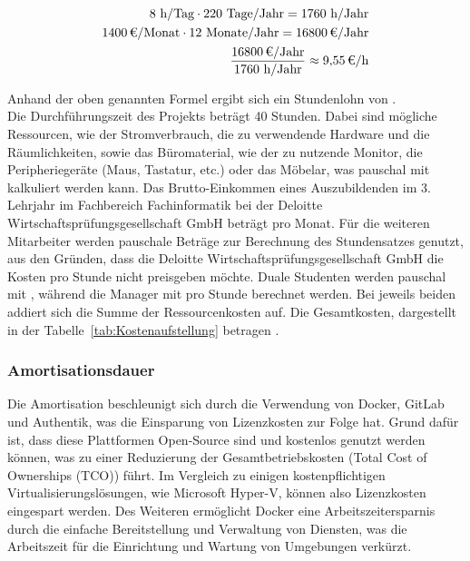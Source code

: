 \begin{eqnarray}
	8 \mbox{ h/Tag} \cdot 220 \mbox{ Tage/Jahr} = 1760 \mbox{ h/Jahr}\\
	\eur{1400}\mbox{/Monat} \cdot 12 \mbox{ Monate/Jahr} = \eur{16800} \mbox{/Jahr}\\
	\frac{\eur{16800} \mbox{/Jahr}}{1760 \mbox{ h/Jahr}} \approx \eur{9,55}\mbox{/h}
\end{eqnarray}

Anhand der oben genannten Formel ergibt sich ein Stundenlohn von . 
\\Die Durchführungszeit des Projekts beträgt 40 Stunden. 
Dabei sind mögliche Ressourcen, wie der Stromverbrauch, die zu verwendende Hardware und die Räumlichkeiten, sowie das Büromaterial, 
wie \zB der zu nutzende Monitor, die Peripheriegeräte (Maus, Tastatur, etc.) oder das Möbelar, was pauschal mit  kalkuliert werden kann. 
Das Brutto-Einkommen eines Auszubildenden im 3. Lehrjahr im Fachbereich Fachinformatik bei der Deloitte Wirtschaftsprüfungsgesellschaft GmbH 
beträgt  pro Monat. 
Für die weiteren Mitarbeiter werden pauschale Beträge zur Berechnung des Stundensatzes genutzt, aus den Gründen, dass die 
Deloitte Wirtschaftsprüfungsgesellschaft GmbH die Kosten pro Stunde nicht preisgeben möchte. Duale Studenten werden pauschal mit 
, während die Manager mit  pro Stunde berechnet werden. Bei jeweils beiden addiert sich die Summe der 
Ressourcenkosten auf. Die Gesamtkosten, dargestellt in der Tabelle~\ref{tab:Kostenaufstellung} betragen .


\subsubsection{Amortisationsdauer}
\label{sec:Amortisationsdauer}
Die Amortisation beschleunigt sich durch die Verwendung von Docker, GitLab und Authentik, was die Einsparung von Lizenzkosten zur Folge hat. 
Grund dafür ist, dass diese Plattformen Open-Source sind und kostenlos genutzt werden können, was zu einer Reduzierung der  
Gesamtbetriebskosten (Total Cost of Ownerships (TCO)) führt. 
Im Vergleich zu einigen kostenpflichtigen Virtualisierungslösungen, wie \zB Microsoft Hyper-V, können also Lizenzkosten eingespart werden. 
Des Weiteren ermöglicht Docker eine Arbeitszeitersparnis durch die einfache Bereitstellung und Verwaltung von Diensten, was die Arbeitszeit für die 
Einrichtung und Wartung von Umgebungen verkürzt.


